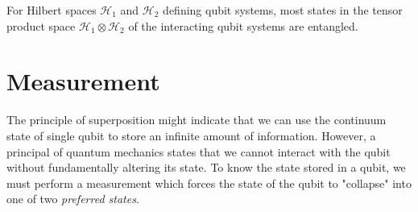 \documentclass[12pt,twoside,fleqn]{report}
\makeatletter
\theoremstyle{thmstyle}
\renewenvironment{proof}[1][\proofname]{\par
\pushQED{\qed}%
\normalfont \topsep6\p@\@plus6\p@\relax
\trivlist
\item[\hskip\labelsep\itshape#1\@addpunct{.}]\mbox{}\par\nobreak\ignorespaces
}{%
    \popQED\endtrivlist\@endpefalse
    }
\newtheorem{prop}{Proposition}[chapter]
\makeatother
\begin{document}
For Hilbert spaces $\mathcal{H}_1$ and $\mathcal{H}_2$ defining qubit systems, most states in the tensor product space $\mathcal{H}_1 \otimes \mathcal{H}_2$ of the interacting qubit systems are entangled.

\begin{comment}
\begin{prop}
    The set of seperable states has measure 0.
\end{prop}


\begin{proof}[intuition]
    refer https://physics.stackexchange.com/questions/268831/are-there-more-entangled-states-or-non-entangled-ones 

    Consider a state $\ket{\psi} = a \ket{0} + b \ket{1} \in \mathcal{H}_1$, $a,b \in \mathbb{C}$. Since $a$ and $b$ are complex coefficients, we would have $4$ degrees of freedom to assign a particular $\ket{\psi}$. However including the constraints that $a^2 + b^2 = 1$ and that multiplying by global phase leaves the state unchanged, we are effectively left with $2$ degrees of freedom for assigning $\ket{\psi}$. 
    
Similarly assigning $\ket{\phi} \in \mathcal{H}_2$ has $2$ degrees of freedom.

    Consider the $4$-dimensional tensor space $\mathcal{H}_1 \otimes \mathcal{H}_2$. Since the state of any vector $\ket{\omega}$ in this space can be written as $\ket{\omega} = a \ket{00} + b \ket{01} + c \ket{10} + d \ket{11}$, where $a, b, c, d \in \mathbb{C}$ we have $8$ degrees of freedom initially for assigning the vector $\ket{\omega}$. Including constraint $a^2 + b^2 + c^2 + d^2 = 1$ and that multiplying by global phase leaves the state unchanged, we have $6$ degrees of freedom in assigning the value of $\ket{\omega}$ which is $2$ degrees of freedom more than $4 = 2 \times 2$ from the individual qubits.
\end{proof}
\end{comment}

\section{Measurement}
The principle of superposition might indicate that we can use the continuum state of single qubit to store an infinite amount of information. However, a principal of quantum mechanics states that we cannot interact with the qubit without fundamentally altering its state. To know the state stored in a qubit, we must perform a measurement which forces the state of the qubit to "collapse" into one of two \textit{preferred states}.
\end{document}
